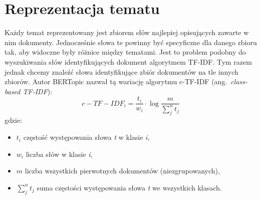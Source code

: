 \section{Reprezentacja tematu}
	Każdy temat reprezentowany jest zbiorem słów najlepiej opisujących zawarte w nim dokumenty.
	Jednocześnie słowa te powinny być specyficzne dla danego zbioru tak, aby widoczne były różnice między tematami.
	Jest to problem podobny do wyszukiwania słów identyfikujących dokument algorytmem TF-IDF\@.
	Tym razem jednak chcemy znaleźć słowa identyfikujące zbiór dokumentów na tle innych zbiorów.
	Autor BERTopic nazwał tą wariację algorytmu c-TF-IDF\cite{BERTopic} (ang.\ \emph{class-based TF-IDF}):
	\[c-TF-IDF_i = \frac{t_i}{w_i} \cdot \log \frac{m}{\sum_j^n t_j} \]
	gdzie:
	\begin{itemize}
		\item \(t_i\) częstość występowania słowa \emph{t} w klasie \emph{i},
		\item \(w_i\) liczba słów w klasie \emph{i},
		\item \(m\) liczba wszystkich pierwotnych dokumentów (niezgrupowanych),
		\item \(\sum_j^n t_j\) suma częstości występowania słowa \emph{t} we wszystkich klasach.
	\end{itemize}

